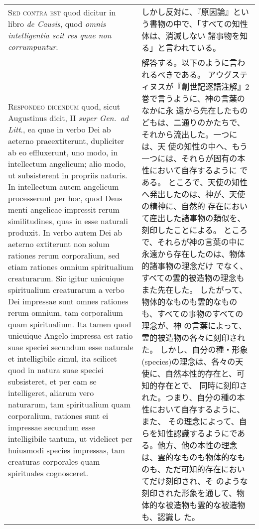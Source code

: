 \documentclass[10pt]{jsarticle} %
\begin{document}
\begin{longtable}{p{21em}p{21em}}
\\


{\scshape  Sed contra est} quod dicitur in libro {\itshape de
Causis}, quod {\itshape omnis intelligentia scit res quae non corrumpuntur}.


&

しかし反対に、『原因論』という書物の中で、「すべての知性体は、消滅しない
 諸事物を知る」と言われている。


\\


{\scshape Respondeo dicendum} quod, sicut Augustinus
dicit, II {\itshape super Gen.~ad Litt}., ea quae in verbo Dei ab aeterno
praeextiterunt, dupliciter ab eo effluxerunt, uno modo, in intellectum
angelicum; alio modo, ut subsisterent in propriis naturis. In
intellectum autem angelicum processerunt per hoc, quod Deus menti
angelicae impressit rerum similitudines, quas in esse naturali
produxit. In verbo autem Dei ab aeterno extiterunt non solum rationes
rerum corporalium, sed etiam rationes omnium spiritualium
creaturarum. Sic igitur unicuique spiritualium creaturarum a verbo Dei
impressae sunt omnes rationes rerum omnium, tam corporalium quam
spiritualium. Ita tamen quod unicuique Angelo impressa est ratio suae
speciei secundum esse naturale et intelligibile simul, ita scilicet quod
in natura suae speciei subsisteret, et per eam se intelligeret, aliarum
vero naturarum, tam spiritualium quam corporalium, rationes sunt ei
impressae secundum esse intelligibile tantum, ut videlicet per huiusmodi
species impressas, tam creaturas corporales quam spirituales
cognosceret.



&

解答する。以下のように言われるべきである。
アウグスティヌスが『創世記逐語注解』2巻で言うように、神の言葉のなかに永
 遠から先在したものどもは、二通りのかたちで、それから流出した。一つには、天
 使の知性の中へ、もう一つには、それらが固有の本性において自存するように
 である。
ところで、天使の知性へ発出したのは、神が、天使の精神に、自然的
 存在において産出した諸事物の類似を、刻印したことによる。
ところで、それらが神の言葉の中に永遠から存在したのは、物体的諸事物の理念だけ
 でなく、すべての霊的被造物の理念もまた先在した。
したがって、物体的なものも霊的なものも、すべての事物のすべての理念が、神
 の言葉によって、霊的被造物の各々に刻印された。
しかし、自分の種・形象(species)の理念は、各々の天使に、自然本性的存在と、可知的存在とで、
 同時に刻印された。つまり、自分の種の本性において自存するように、また、
 その理念によって、自らを知性認識するようにである。他方、他の本性の理念
 は、霊的なものも物体的なものも、ただ可知的存在においてだけ刻印され、そ
 のような刻印された形象を通して、物体的な被造物も霊的な被造物も、認識し
 た。






\end{longtable}
\end{document}
